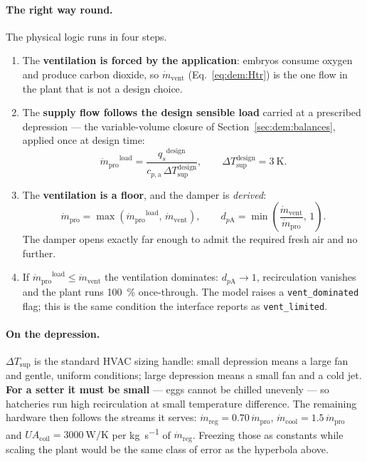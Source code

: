 \documentclass[11pt]{article}
\newcommand{\md}{\ensuremath{\dot m}}
\newcommand{\mdp}{\ensuremath{\dot m_{\mathrm{pro}}}}
\newcommand{\mdr}{\ensuremath{\dot m_{\mathrm{reg}}}}
\newcommand{\mdv}{\ensuremath{\dot m_{\mathrm{vent}}}}
\newcommand{\UA}{\ensuremath{U\!A}}
\newcommand{\qs}{\ensuremath{q_{s}}}
\begin{document}
\paragraph{The right way round.} The physical logic runs in four steps.
\begin{enumerate}[nosep]
\item The \textbf{ventilation is forced by the application}: embryos consume
oxygen and produce carbon dioxide, so $\mdv$ (Eq.~\eqref{eq:dem:Htr}) is the one
flow in the plant that is not a design choice.
\item The \textbf{supply flow follows the design sensible load} carried at a
prescribed depression --- the variable-volume closure of
Section~\ref{sec:dem:balances}, applied once at design time:
\begin{equation}
\mdp^{\mathrm{load}}=\frac{\qs^{\mathrm{design}}}
{c_{p,\mathrm{a}}\,\Delta T_{\mathrm{sup}}^{\mathrm{design}}},
\qquad \Delta T_{\mathrm{sup}}^{\mathrm{design}}=\SI{3}{\kelvin}.
\label{eq:dem:mdotload}
\end{equation}
\item The \textbf{ventilation is a floor}, and the damper is \emph{derived}:
\begin{equation}
\boxed{\;\mdp=\max\!\left(\mdp^{\mathrm{load}},\,\mdv\right),\qquad
d_{p\mathrm{A}}=\min\!\left(\frac{\mdv}{\mdp},\,1\right).\;}
\label{eq:dem:causality}
\end{equation}
The damper opens exactly far enough to admit the required fresh air and no
further.
\item If $\mdp^{\mathrm{load}}\le\mdv$ the ventilation dominates:
$d_{p\mathrm{A}}\to1$, recirculation vanishes and the plant runs
\SI{100}{\percent} once-through. The model raises a \verb|vent_dominated| flag;
this is the same condition the interface reports as \verb|vent_limited|.
\end{enumerate}

\paragraph{On the depression.} $\Delta T_{\mathrm{sup}}$ is the standard HVAC
sizing handle: small depression means a large fan and gentle, uniform conditions;
large depression means a small fan and a cold jet. \textbf{For a setter it must
be small} --- eggs cannot be chilled unevenly --- so hatcheries run high
recirculation at small temperature difference. The remaining hardware then
follows the streams it serves:
$\mdr=0.70\,\mdp$, $\md_{\mathrm{cool}}=1.5\,\mdp$ and
$\UA_{\mathrm{coil}}=\SI{3000}{\watt\per\kelvin}$ per \si{\kilogram\per\second}
of $\mdr$. Freezing those as constants while scaling the plant would be the same
class of error as the hyperbola above.
\end{document}
